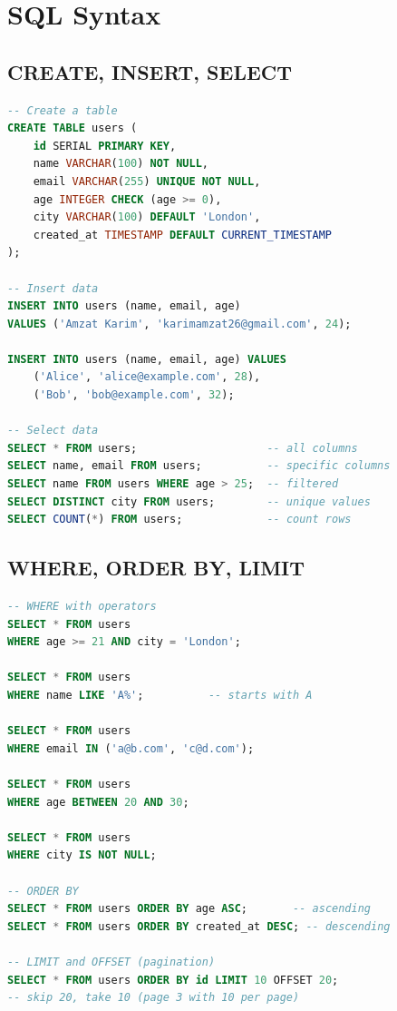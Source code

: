\documentclass[12pt, a4paper, oneside]{book}
\begin{document}
\section{SQL Syntax}

\subsection{CREATE, INSERT, SELECT}

\begin{lstlisting}[language=SQL, caption={Basic SQL operations}]
-- Create a table
CREATE TABLE users (
    id SERIAL PRIMARY KEY,
    name VARCHAR(100) NOT NULL,
    email VARCHAR(255) UNIQUE NOT NULL,
    age INTEGER CHECK (age >= 0),
    city VARCHAR(100) DEFAULT 'London',
    created_at TIMESTAMP DEFAULT CURRENT_TIMESTAMP
);

-- Insert data
INSERT INTO users (name, email, age)
VALUES ('Amzat Karim', 'karimamzat26@gmail.com', 24);

INSERT INTO users (name, email, age) VALUES
    ('Alice', 'alice@example.com', 28),
    ('Bob', 'bob@example.com', 32);

-- Select data
SELECT * FROM users;                    -- all columns
SELECT name, email FROM users;          -- specific columns
SELECT name FROM users WHERE age > 25;  -- filtered
SELECT DISTINCT city FROM users;        -- unique values
SELECT COUNT(*) FROM users;             -- count rows
\end{lstlisting}

\subsection{WHERE, ORDER BY, LIMIT}

\begin{lstlisting}[language=SQL, caption={Filtering and sorting}]
-- WHERE with operators
SELECT * FROM users
WHERE age >= 21 AND city = 'London';

SELECT * FROM users
WHERE name LIKE 'A%';          -- starts with A

SELECT * FROM users
WHERE email IN ('a@b.com', 'c@d.com');

SELECT * FROM users
WHERE age BETWEEN 20 AND 30;

SELECT * FROM users
WHERE city IS NOT NULL;

-- ORDER BY
SELECT * FROM users ORDER BY age ASC;       -- ascending
SELECT * FROM users ORDER BY created_at DESC; -- descending

-- LIMIT and OFFSET (pagination)
SELECT * FROM users ORDER BY id LIMIT 10 OFFSET 20;
-- skip 20, take 10 (page 3 with 10 per page)
\end{lstlisting}
\end{document}
